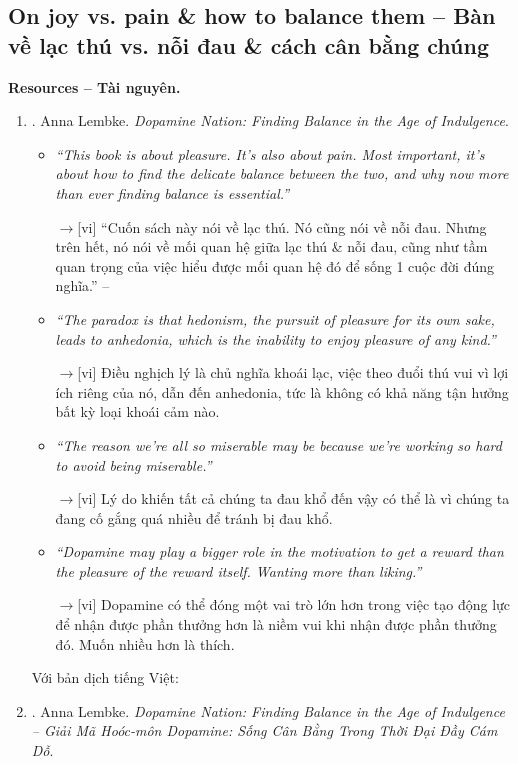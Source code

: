 \documentclass[12pt,twoside]{book}
\begin{document}
\subsection{On joy vs. pain \& how to balance them -- Bàn về lạc thú vs. nỗi đau \& cách cân bằng chúng}
{\bf \textsf{Resources -- Tài nguyên.}}
\begin{enumerate}
	\item \cite{Lembke_dopamine}. {\sc Anna Lembke}. {\it Dopamine Nation: Finding Balance in the Age of Indulgence}.
	\begin{itemize}
		\item {\it``This book is about pleasure. It's also about pain. Most important, it's about how to find the delicate balance between the two, and why now more than ever finding balance is essential.''}
		
		{\sf[en]$\to$[vi]} ``Cuốn sách này nói về lạc thú. Nó cũng nói về nỗi đau. Nhưng trên hết, nó nói về mối quan hệ giữa lạc thú \& nỗi đau, cũng như tầm quan trọng của việc hiểu được mối quan hệ đó để sống 1 cuộc đời đúng nghĩa.'' -- \cite[p. 9]{Lembke_dopamine_VN}
		
		\item {\it``The paradox is that hedonism, the pursuit of pleasure for its own sake, leads to anhedonia, which is the inability to enjoy pleasure of any kind.''}
		
		{\sf[en]$\to$[vi]} Điều nghịch lý là chủ nghĩa khoái lạc, việc theo đuổi thú vui vì lợi ích riêng của nó, dẫn đến anhedonia, tức là không có khả năng tận hưởng bất kỳ loại khoái cảm nào.
		
		\item {\it``The reason we're all so miserable may be because we're working so hard to avoid being miserable.''}
		
		{\sf[en]$\to$[vi]} Lý do khiến tất cả chúng ta đau khổ đến vậy có thể là vì chúng ta đang cố gắng quá nhiều để tránh bị đau khổ.
		
		\item {\it``Dopamine may play a bigger role in the motivation to get a reward than the pleasure of the reward itself. Wanting more than liking.''}
		
		{\sf[en]$\to$[vi]} Dopamine có thể đóng một vai trò lớn hơn trong việc tạo động lực để nhận được phần thưởng hơn là niềm vui khi nhận được phần thưởng đó. Muốn nhiều hơn là thích.
	\end{itemize}
	Với bản dịch tiếng Việt:	
	\item \cite{Lembke_dopamine_VN}. {\sc Anna Lembke}. {\it Dopamine Nation: Finding Balance in the Age of Indulgence -- Giải Mã Hoóc-môn Dopamine: Sống Cân Bằng Trong Thời Đại Đầy Cám Dỗ}.
\end{enumerate}
\end{document}

